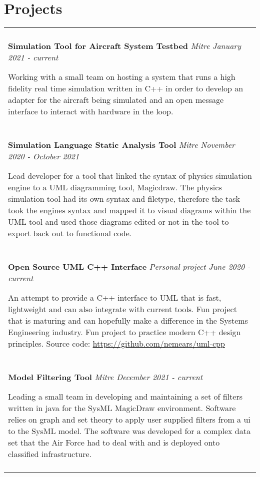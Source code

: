 \documentclass[10pt]{article}
\begin{document}
\section*{Projects}
\begin{tabular}{p{18.5cm}}
    \hline
    \multicolumn{1}{c}{} \\

    \large \textbf{Simulation Tool for Aircraft System Testbed} \normalsize \textit{Mitre \hfill January 2021 - current}

    \> Working with a small team on hosting a system that runs a high fidelity real time 
    simulation written in C++ in order to develop an adapter for the aircraft being simulated and an open
    message interface to interact with hardware in the loop.\\
    \multicolumn{1}{c}{} \\

    \large \textbf{Simulation Language Static Analysis Tool} \normalsize \textit{Mitre \hfill November 2020 - October 2021}  

    \> Lead developer for a tool that linked the syntax of physics simulation engine to a UML diagramming tool, Magicdraw. 
    The physics simulation tool had its own syntax and filetype, therefore the task took the engines syntax and mapped it 
    to visual diagrams within the UML tool and used those diagrams edited or not in the tool to export back out to functional code. \\
    \multicolumn{1}{c}{} \\

    \large \textbf{Open Source UML C++ Interface} \normalsize \textit{Personal project \hfill June 2020 - current}  

    \> An attempt to provide a C++ interface to UML that is fast, lightweight and can also integrate with current tools. Fun project that
    is maturing and can hopefully make a difference in the Systems Engineering industry. Fun project to practice modern C++ design principles.
    Source code: \url{https://github.com/nemears/uml-cpp} \\
    \multicolumn{1}{c}{} \\

    \large \textbf{Model Filtering Tool} \normalsize \textit{Mitre \hfill December 2021 - current}  

    \> Leading a small team in developing and maintaining a set of filters written in java for the SysML MagicDraw environment. Software relies on 
    graph and set theory to apply user supplied filters from a ui to the SysML model. The software was developed for a complex data set
    that the Air Force had to deal with and is deployed onto classified infrastructure.\\
    \multicolumn{1}{c}{} \\


\end{tabular}
\end{document}
